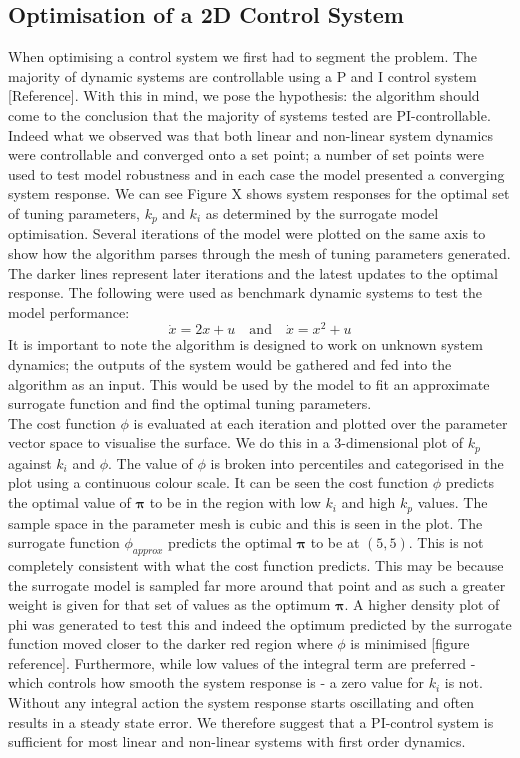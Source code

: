 \documentclass[conference]{IEEEtran}
\theoremstyle{definition}
\begin{document}
\subsection{Optimisation of a 2D Control System}

When optimising a control system we first had to segment the problem. The majority of dynamic systems are controllable using a P and I control system [Reference]. With this in mind, we pose the hypothesis: the algorithm should come to the conclusion that the majority of systems tested are PI-controllable. Indeed what we observed was that both linear and non-linear system dynamics were controllable and converged onto a set point; a number of set points were used to test model robustness and in each case the model presented a converging system response. We can see Figure X shows system responses for the optimal set of tuning parameters, $k_p$ and $k_i$  as determined by the surrogate model optimisation. Several iterations of the model were plotted on the same axis to show how the algorithm parses through the mesh of tuning parameters generated. The darker lines represent later iterations and the latest updates to the optimal response. The following were used as benchmark dynamic systems to test the model performance:
\begin{equation}
\dot{x} = 2x +u \quad \textrm{and} \quad \dot{x} = x^2 + u
\end{equation}
It is important to note the algorithm is designed to work on unknown system dynamics; the outputs of the system would be gathered and fed into the algorithm as an input. This would be used by the model to fit an approximate surrogate function and find the optimal tuning parameters.\\
The cost function $\phi$ is evaluated at each iteration and plotted over the parameter vector space to visualise the surface. We do this in a 3-dimensional plot of $k_p$ against $k_i$ and $\phi$. The value of $\phi$ is broken into percentiles and categorised in the plot using a continuous colour scale. It can be seen the cost function $\phi$ predicts the optimal value of $\boldsymbol \pi$ to be in the region with low $k_i$ and high $k_p$ values. The sample space in the parameter mesh is cubic and this is seen in the plot. The surrogate function $\phi_{approx}$ predicts the optimal $\boldsymbol \pi$ to be at $(5,5)$. This is not completely consistent with what the cost function predicts. This may be because the surrogate model is sampled far more around that point and as such a greater weight is given for that set of values as the optimum $\boldsymbol \pi$. A higher density plot of phi was generated to test this and indeed the optimum predicted by the surrogate function moved closer to the darker red region where $\phi$ is minimised [figure reference].
Furthermore, while low values of the integral term are preferred - which controls how smooth the system response is - a zero value for $k_i$ is not. Without any integral action the system response starts oscillating and often results in a steady state error. We therefore suggest that a PI-control system is sufficient for most linear and non-linear systems with first order dynamics. 
\end{document}
